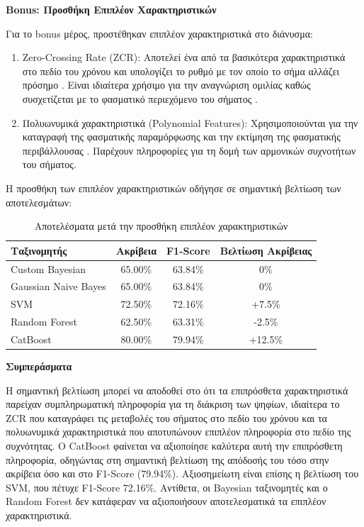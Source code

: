 \documentclass[a4paper,12pt]{article}
\begin{document}
\textbf{Bonus: Προσθήκη Επιπλέον Χαρακτηριστικών}

Για το bonus μέρος, προστέθηκαν επιπλέον χαρακτηριστικά στο διάνυσμα:

\begin{enumerate}
   \item Zero-Crossing Rate (ZCR): Αποτελεί ένα από τα βασικότερα χαρακτηριστικά στο πεδίο του χρόνου 
   και υπολογίζει το ρυθμό με τον οποίο το σήμα αλλάζει πρόσημο \cite{kedem1986spectral}. Είναι ιδιαίτερα 
   χρήσιμο για την αναγνώριση ομιλίας καθώς συσχετίζεται με το φασματικό περιεχόμενο του σήματος \cite{bachu2010voiced}.
   
   \item Πολυωνυμικά χαρακτηριστικά (Polynomial Features): Χρησιμοποιούνται για την καταγραφή της 
   φασματικής παραμόρφωσης και την εκτίμηση της φασματικής περιβάλλουσας \cite{noll1967cepstrum}. Παρέχουν 
   πληροφορίες για τη δομή των αρμονικών συχνοτήτων του σήματος.
\end{enumerate}

Η προσθήκη των επιπλέον χαρακτηριστικών οδήγησε σε σημαντική βελτίωση των αποτελεσμάτων:

\begin{table}[h]
\centering
\begin{tabular}{lccc}
\hline
\textbf{Ταξινομητής} & \textbf{Ακρίβεια} & \textbf{F1-Score} & \textbf{Βελτίωση Ακρίβειας} \\
\hline
Custom Bayesian & 65.00\% & 63.84\% & 0\% \\
Gaussian Naive Bayes & 65.00\% & 63.84\% & 0\% \\
SVM & 72.50\% & 72.16\% & +7.5\% \\
Random Forest & 62.50\% & 63.31\% & -2.5\% \\
CatBoost & 80.00\% & 79.94\% & +12.5\% \\
\hline
\end{tabular}
\caption{Αποτελέσματα μετά την προσθήκη επιπλέον χαρακτηριστικών}
\end{table}

\textbf{Συμπεράσματα}

Η σημαντική βελτίωση μπορεί να αποδοθεί στο ότι τα επιπρόσθετα χαρακτηριστικά παρείχαν 
συμπληρωματική πληροφορία για τη διάκριση των ψηφίων, ιδιαίτερα το ZCR που καταγράφει 
τις μεταβολές του σήματος στο πεδίο του χρόνου και τα πολυωνυμικά χαρακτηριστικά που 
αποτυπώνουν επιπλέον πληροφορία στο πεδίο της συχνότητας. Ο CatBoost φαίνεται να 
αξιοποίησε καλύτερα αυτή την επιπρόσθετη πληροφορία, οδηγώντας στη σημαντική βελτίωση 
της απόδοσής του τόσο στην ακρίβεια όσο και στο F1-Score (79.94\%). Αξιοσημείωτη 
είναι επίσης η βελτίωση του SVM, που πέτυχε F1-Score 72.16\%. Αντίθετα, οι Bayesian 
ταξινομητές και ο Random Forest δεν κατάφεραν να αξιοποιήσουν αποτελεσματικά τα 
επιπλέον χαρακτηριστικά.
\end{document}
